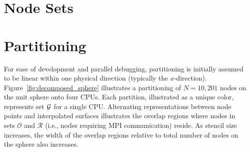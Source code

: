 \documentclass{report}
\begin{document}
%
%
%
%


\section{Node Sets}




\section{Partitioning}

For ease of development and parallel debugging, partitioning is initially
assumed to be linear within one physical direction (typically the
$x$-direction). Figure~\ref{fig:decomposed_sphere} illustrates a partitioning of
$N=10,201$ nodes on the unit sphere onto four CPUs. Each partition, illustrated
as a unique color, represents set $\mathcal{G}$ for a single CPU.  Alternating
representations between node points and interpolated surfaces illustrates the
overlap regions where nodes in sets $\mathcal{O}$ and $\mathcal{R}$ (i.e., nodes
requiring MPI communication) reside. As stencil size increases, the width of the
overlap regions relative to total number of nodes on the sphere also increases. 
\end{document}
